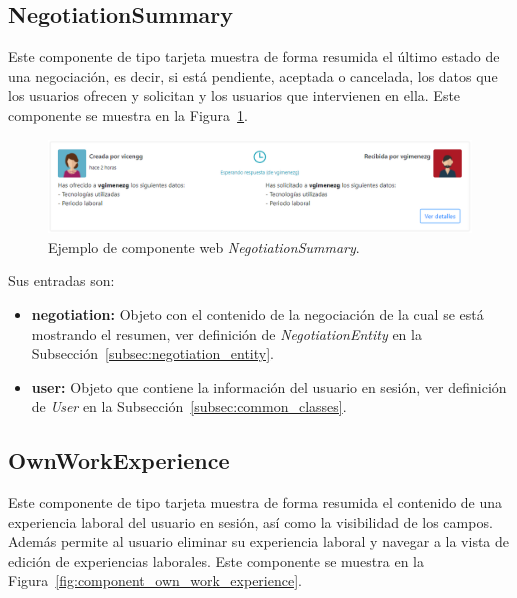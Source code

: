 \documentclass[a4paper, 12pt]{book}
\begin{document}
    \subsection{NegotiationSummary}
    \label{subsec:wc_negotiation_summary}
    Este componente de tipo tarjeta muestra de forma resumida el último estado de una negociación, es decir, si está pendiente, aceptada o cancelada, los datos que los usuarios ofrecen y solicitan y los usuarios que intervienen en ella.
    Este componente se muestra en la Figura~\ref{fig:component_negotiation_summary}.

    \begin{figure}
        \centering
        \includegraphics[width=15cm, keepaspectratio]{img/NegotiationSummary.PNG}
        \caption{Ejemplo de componente web \emph{NegotiationSummary}.}\label{fig:component_negotiation_summary}
    \end{figure}

    Sus entradas son:

    \begin{itemize}
        \item \textbf{negotiation:} Objeto con el contenido de la negociación de la cual se está mostrando el resumen, ver definición de \emph{NegotiationEntity} en la Subsección~\ref{subsec:negotiation_entity}.
        \item \textbf{user:} Objeto que contiene la información del usuario en sesión, ver definición de \emph{User} en la Subsección~\ref{subsec:common_classes}.
    \end{itemize}

    \subsection{OwnWorkExperience}
    \label{subsec:wc_own_work_experience}
    Este componente de tipo tarjeta muestra de forma resumida el contenido de una experiencia laboral del usuario en sesión, así como la visibilidad de los campos. Además permite al usuario eliminar su experiencia laboral y navegar a la vista de edición de experiencias laborales.
    Este componente se muestra en la Figura~\ref{fig:component_own_work_experience}.
\end{document}
